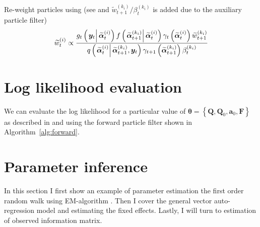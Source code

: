 \documentclass[notitlepage]{article}
\newcommand\StateX{\Statex\hspace{\algorithmicindent}}
\renewcommand{\vec}[1]{\bm{#1}}
\newcommand{\mat}[1]{\mathbf{#1}}
\newcommand{\Lbrace}[1]{\left\{ #1\right\}}
\newcommand{\Lparen}[1]{\left( #1\right)}
\newcommand{\Cond}[2]{\left. #1 \vphantom{#2} \right\vert  #2}
\newcommand{\optor}[2]{#1\Lparen{#2}}
\newcommand{\optorC}[3]{\optor{#1}{\Cond{#2}{#3}}}
\newcommand{\gFunc}[3]{\optorC{g_{#3}}{#1}{#2}}
\newcommand{\fFunc}[2]{\optorC{f}{#1}{#2}}
\newcommand{\IDC}[2]{\optorC{q}{#1}{#2}}
\newcommand{\partic}[3]{#1_{#2}^{\Lparen{#3}}}
\newcommand{\particB}[3]{\widetilde{#1}_{#2}^{\Lparen{#3}}}
\begin{document}
\begin{algorithm}[H]
\begin{algorithmic}[1]
\EndProcedure
%
\State Re-weight particles using (see \citet[page 72]{briers09} and $\particB{w}{t + 1}{k_i}/\partic{\beta}{t}{k_i}$ is added due to the auxiliary particle filter)
\StateX \begin{equation}\label{eqn:backwardWeight}
	\particB{w}{t}{i} \propto \frac{
		\gFunc{\vec{y}_t}{\particB{\vec{\alpha}}{t}{i}}{t}
		\fFunc{\particB{\vec{\alpha}}{t + 1}{k_i}}{\particB{\vec{\alpha}}{t}{i}}
		\gamma_t\Lparen{\particB{\vec{\alpha}}{t}{i}}
		\particB{w}{t + 1}{k_i}
	}{ %
		\IDC{\particB{\vec{\alpha}}{t}{i}}{\particB{\vec{\alpha}}{t + 1}{k_i}, \vec{y}_t}
		\gamma_{t + 1}\Lparen{\particB{\vec{\alpha}}{t + 1}{k_i}}
		\partic{\beta}{t}{k_i}
	}
\end{equation}
\EndProcedure
\EndFor
\end{algorithmic}
\end{algorithm}

\newpage

\section{Log likelihood evaluation}
We can evaluate the log likelihood for a particular value of $\vec{\theta} = \Lbrace{\mat{Q}, \mat{Q}_0, \vec{a}_0, \mat{F}}$ as described in \citet[page 5]{doucet09} and \citet[page 193]{malik11} using the forward particle filter shown in Algorithm~\ref{alg:forward}.

\section{Parameter inference}
In this section I first show an example of parameter estimation the first order random walk using EM-algorithm \citep{dempster77}. Then I cover the general vector auto-regression model and estimating the fixed effects. Lastly, I will turn to estimation of observed information matrix. 
\end{document}
